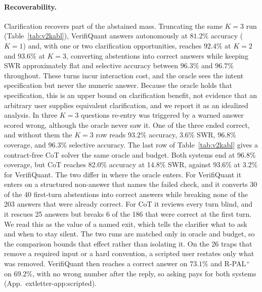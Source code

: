 \documentclass[sigconf]{acmart}
\newcommand{\vqAccAll}{93.6\%}
\newcommand{\vqCovAll}{96.8\%}
\newcommand{\vqSWRAll}{3.2\%}
\newcommand{\cotoAccAll}{82.0\%}
\newcommand{\cotoSWRAll}{14.8\%}
\newif\ifarxiv
\newcommand{\extref}[1]{App.~\ifarxiv\ref{#1}\else\csname extletter-#1\endcsname\fi}
\begin{document}
\paragraph{Recoverability.}
Clarification recovers part of the abstained mass. Truncating the same $K{=}3$ run (Table~\ref{tab:v2kabl}), VerifiQuant answers autonomously at $81.2\%$ accuracy ($K{=}1$) and, with one or two clarification opportunities, reaches $92.4\%$ at $K{=}2$ and \vqAccAll{} at $K{=}3$, converting abstentions into correct answers while keeping SWR approximately flat and selective accuracy between $96.3\%$ and $96.7\%$ throughout. These turns incur interaction cost, and the oracle sees the intent specification but never the numeric answer. Because the oracle holds that specification, this is an upper bound on clarification benefit, not evidence that an arbitrary user supplies equivalent clarification, and we report it as an idealized analysis. In three $K{=}3$ questions re-entry was triggered by a warned answer scored wrong, although the oracle never saw it. One of the three ended correct, and without them the $K{=}3$ row reads 93.2\% accuracy, 3.6\% SWR, 96.8\% coverage, and 96.3\% selective accuracy.
The last row of Table~\ref{tab:v2kabl} gives a contract-free CoT solver the same oracle and budget. Both systems end at \vqCovAll{} coverage, but CoT reaches \cotoAccAll{} accuracy at \cotoSWRAll{} SWR, against \vqAccAll{} at \vqSWRAll{} for VerifiQuant. The two differ in where the oracle enters. For VerifiQuant it enters on a structured non-answer that names the failed check, and it converts 30 of the 40 first-turn abstentions into correct answers while breaking none of the 203 answers that were already correct. For CoT it reviews every turn blind, and it rescues 25 answers but breaks 6 of the 186 that were correct at the first turn. We read this as the value of a named exit, which tells the clarifier what to ask and when to stay silent. The two runs are matched only in oracle and budget, so the comparison bounds that effect rather than isolating it.
On the 26 traps that remove a required input or a hard convention, a scripted user restates only what was removed. VerifiQuant then reaches a correct answer on $73.1\%$ and R-PAL$^{+}$ on $69.2\%$, with no wrong number after the reply, so asking pays for both systems (\extref{app:scripted}).
\end{document}
